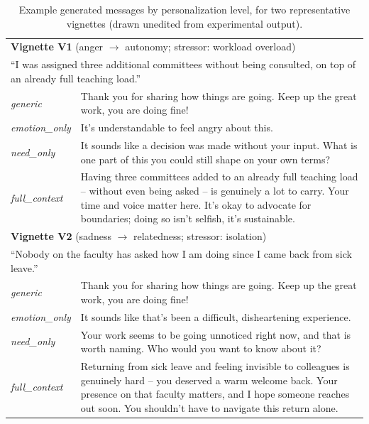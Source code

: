 \documentclass[higheredu,article,submit,pdftex,moreauthors]{Definitions/mdpi}
\begin{document}
\begin{table}[H]
\caption{Example generated messages by personalization level, for two representative vignettes (drawn unedited from experimental output).\label{tab:example-messages}}
\begin{tabularx}{\textwidth}{lX}
\toprule
\multicolumn{2}{l}{\textbf{Vignette V1} (anger $\rightarrow$ autonomy; stressor: workload overload)} \\
\multicolumn{2}{p{\dimexpr\textwidth-2\tabcolsep\relax}}{\footnotesize ``I was assigned three additional committees without being consulted, on top of an already full teaching load.''} \\
\midrule
\textit{generic} & Thank you for sharing how things are going. Keep up the great work, you are doing fine! \\
\textit{emotion\_only} & It's understandable to feel angry about this. \\
\textit{need\_only} & It sounds like a decision was made without your input. What is one part of this you could still shape on your own terms? \\
\textit{full\_context} & Having three committees added to an already full teaching load -- without even being asked -- is genuinely a lot to carry. Your time and voice matter here. It's okay to advocate for boundaries; doing so isn't selfish, it's sustainable. \\
\midrule
\multicolumn{2}{l}{\textbf{Vignette V2} (sadness $\rightarrow$ relatedness; stressor: isolation)} \\
\multicolumn{2}{p{\dimexpr\textwidth-2\tabcolsep\relax}}{\footnotesize ``Nobody on the faculty has asked how I am doing since I came back from sick leave.''} \\
\midrule
\textit{generic} & Thank you for sharing how things are going. Keep up the great work, you are doing fine! \\
\textit{emotion\_only} & It sounds like that's been a difficult, disheartening experience. \\
\textit{need\_only} & Your work seems to be going unnoticed right now, and that is worth naming. Who would you want to know about it? \\
\textit{full\_context} & Returning from sick leave and feeling invisible to colleagues is genuinely hard -- you deserved a warm welcome back. Your presence on that faculty matters, and I hope someone reaches out soon. You shouldn't have to navigate this return alone. \\
\bottomrule
\end{tabularx}
\end{table}
\end{document}
